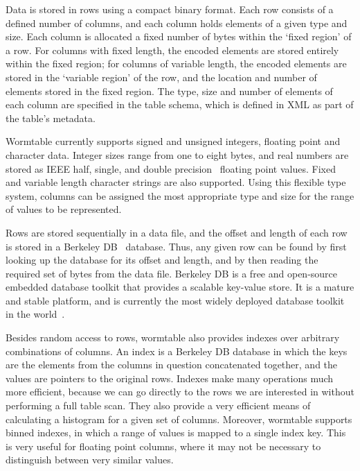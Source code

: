 \documentclass[10pt]{bmc_article}
\newenvironment{bmcformat}{\begin{raggedright}\baselineskip20pt\sloppy\setboolean{publ}{false}}{\end{raggedright}\baselineskip20pt\sloppy}
\begin{document}
\begin{bmcformat}
Data is stored in rows using a compact binary format.
Each row consists of a defined number of columns, and each column 
holds elements of a given type and size.
Each column is allocated a fixed number of bytes within the `fixed region' of 
a row. For columns with fixed length, the encoded elements are stored entirely within the
fixed region; for columns of variable length, the encoded elements are 
stored in the `variable region' of the row, and the location and number 
of elements stored in the fixed region. The type, size and number 
of elements of 
each column are specified in the table schema, which is defined 
in XML as part of the table's metadata.

Wormtable currently supports signed and unsigned integers, 
floating point and character data. Integer sizes range 
from one to eight bytes, and real numbers are stored as 
IEEE half, single, and double precision~\cite{ieee08}
floating point values.  
Fixed and variable length character strings 
are also supported. Using this flexible type system, columns can 
be assigned the most appropriate type and size for the range of
values to be represented.

Rows are stored sequentially in a data file, and the offset and length 
of each row is stored in a Berkeley DB~\cite{obs99} database. 
Thus, any given row can be found 
by first looking up the database for its offset and length, and by then reading
the required set of bytes from the data file. 
Berkeley DB is a free and open-source embedded database toolkit that provides a
scalable key-value store. It is a mature and stable platform, 
and is currently the most widely deployed database toolkit in the 
world~\cite{sb12}. 

Besides random access to rows, wormtable also provides indexes
over arbitrary combinations of columns. An index is a 
Berkeley DB database in 
which the keys are the elements from the columns in question concatenated
together, and the values are pointers to the original rows. Indexes make
many operations much more efficient, because we can go directly to the 
rows we are interested in without performing a full table scan. They also 
provide a very efficient means of calculating a histogram for a given 
set of columns. Moreover, wormtable supports binned indexes, in which a range of 
values is mapped to a single index key. This is very useful for floating 
point columns, where it may not be necessary to distinguish between
very similar values.


\end{bmcformat}
\end{document}
